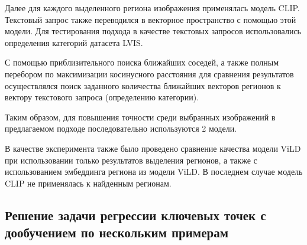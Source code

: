 \documentclass[a4paper,14pt]{article}
\begin{document}
	Далее для каждого выделенного региона изображения применялась модель CLIP. 
	Текстовый запрос также переводился в векторное пространство с помощью этой модели. 
	Для тестирования подхода в качестве текстовых запросов использовались определения категорий датасета LVIS.
	
	С помощью приблизительного поиска ближайших соседей, а также полным перебором по максимизации косинусного расстояния для сравнения результатов осуществлялся поиск заданного количества ближайших векторов регионов к вектору текстового запроса (определению категории).
	
    
    Таким образом, для повышения точности среди выбранных изображений в предлагаемом подходе последовательно используются 2 модели.
    
    В качестве эксперимента также было проведено сравнение качества модели ViLD при использовании только результатов выделения регионов, а также с использованием эмбеддинга региона из модели ViLD. 
    В последнем случае модель CLIP не применялась к найденным регионам.
    
    \subsection{Решение задачи регрессии ключевых точек с дообучением по нескольким примерам}
    
\end{document}
